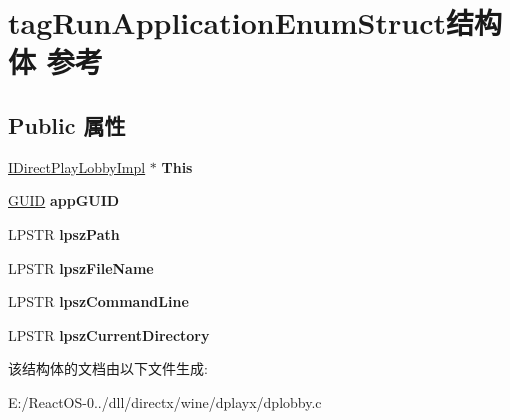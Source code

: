 \hypertarget{structtag_run_application_enum_struct}{}\section{tag\+Run\+Application\+Enum\+Struct结构体 参考}
\label{structtag_run_application_enum_struct}
\subsection*{Public 属性}
\begin{DoxyCompactItemize}
\item 
\mbox{\label{structtag_run_application_enum_struct_a3bf2adf42909e20797c60c48ea0ce3a8}} 
\hyperlink{struct_i_direct_play_lobby_impl}{I\+Direct\+Play\+Lobby\+Impl} $\ast$ {\bfseries This}
\item 
\mbox{\label{structtag_run_application_enum_struct_ae52314711a272cf65ab57cb86c0d2a79}} 
\hyperlink{interface_g_u_i_d}{G\+U\+ID} {\bfseries app\+G\+U\+ID}
\item 
\mbox{\label{structtag_run_application_enum_struct_a4cba78aee64afe370ec4b3c3d75a7fb4}} 
L\+P\+S\+TR {\bfseries lpsz\+Path}
\item 
\mbox{\label{structtag_run_application_enum_struct_a61398efdedb5b5dfd05f014aa43b2b46}} 
L\+P\+S\+TR {\bfseries lpsz\+File\+Name}
\item 
\mbox{\label{structtag_run_application_enum_struct_ae4d335e9a1953a246ae404c0b9c3e18c}} 
L\+P\+S\+TR {\bfseries lpsz\+Command\+Line}
\item 
\mbox{\label{structtag_run_application_enum_struct_a6e4cd383139749f843a22b3555b63548}} 
L\+P\+S\+TR {\bfseries lpsz\+Current\+Directory}
\end{DoxyCompactItemize}


该结构体的文档由以下文件生成\+:\begin{DoxyCompactItemize}
\item 
E\+:/\+React\+O\+S-\/0../dll/directx/wine/dplayx/dplobby.\+c\end{DoxyCompactItemize}
